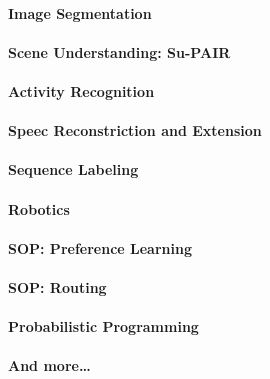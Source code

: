 		\paragraph{Image Segmentation} %

		\paragraph{Scene Understanding: Su-PAIR} %

		\paragraph{Activity Recognition} %

		\paragraph{Speec Reconstriction and Extension} %

		\paragraph{Sequence Labeling} %

		\paragraph{Robotics} %

		\paragraph{SOP: Preference Learning} %

		\paragraph{SOP: Routing} %

		\paragraph{Probabilistic Programming} %

		\paragraph{And more\dots} %

